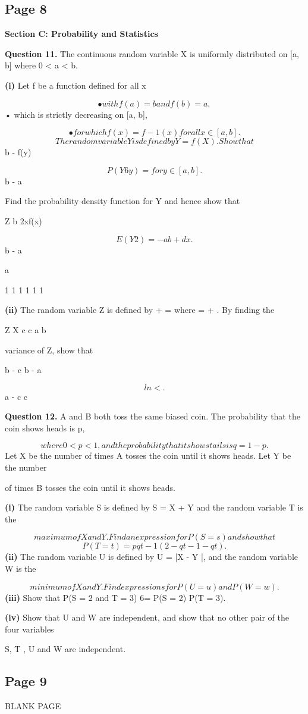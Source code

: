 \documentclass[12pt]{article}
\begin{document}
\subsection*{Page 8}
\begin{flushleft}
\bigskip\textbf{Section C: Probability and Statistics}\par
\bigskip\textbf{Question 11.} The continuous random variable X is uniformly distributed on [a, b] where 0 < a < b.\par
\textbf{(i)} Let f be a function defined for all x \in [a, b]\par
\[• with f(a) = b and f(b) = a,\]
• which is strictly decreasing on [a, b],\par
\[• for which f(x) = f-1(x) for all x \in [a, b].\]
\[The random variable Y is defined by Y = f(X). Show that\]
b - f(y)\par
\[P(Y 6 y) = for y \in [a, b].\]
b - a\par
Find the probability density function for Y and hence show that\par
Z b 2xf(x)\par
\[E(Y 2) = -ab + dx.\]
b - a\par
a\par
1 1 1 1 1 1\par
\textbf{(ii)} The random variable Z is defined by + = where = + . By finding the\par
Z X c c a b\par
variance of Z, show that\par
\lambda \mu\par
b - c b - a\par
\[ln < .\]
a - c c\par
\bigskip\textbf{Question 12.} A and B both toss the same biased coin. The probability that the coin shows heads is p,\par
\[where 0 < p < 1, and the probability that it shows tails is q = 1 - p.\]
Let X be the number of times A tosses the coin until it shows heads. Let Y be the number\par
of times B tosses the coin until it shows heads.\par
\textbf{(i)} The random variable S is defined by S = X + Y and the random variable T is the\par
\[maximum of X and Y . Find an expression for P(S = s) and show that\]
\[P(T = t) = pqt-1(2 - qt-1 - qt).\]
\textbf{(ii)} The random variable U is defined by U = |X - Y |, and the random variable W is the\par
\[minimum of X and Y . Find expressions for P(U = u) and P(W = w).\]
\textbf{(iii)} Show that P(S = 2 and T = 3) 6= P(S = 2) \times P(T = 3).\par
\textbf{(iv)} Show that U and W are independent, and show that no other pair of the four variables\par
S, T , U and W are independent.\par
\end{flushleft}
\subsection*{Page 9}
\begin{flushleft}
BLANK PAGE\par
\end{flushleft}
\end{document}
